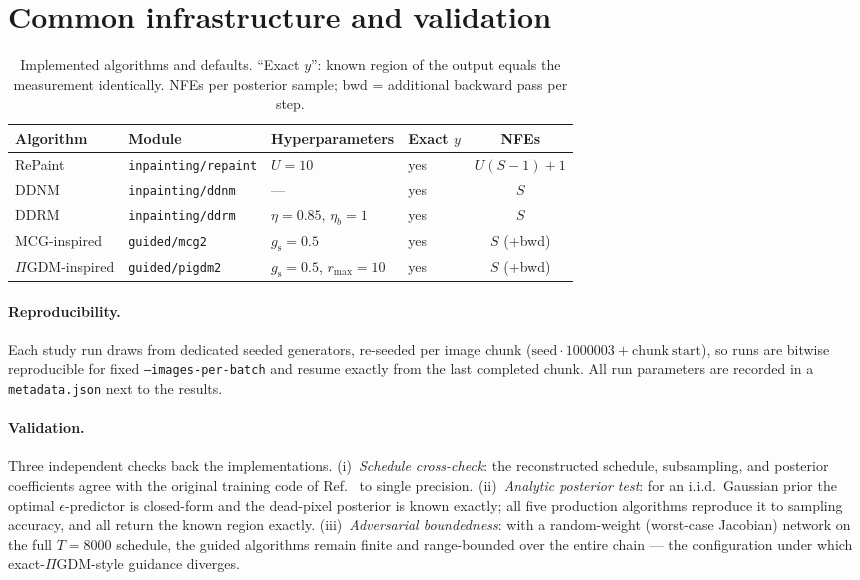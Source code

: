 \documentclass[11pt]{article}
\begin{document}
\section{Common infrastructure and validation}
\label{sec:infra}

\begin{table}[h]
  \centering
  \caption{Implemented algorithms and defaults.  ``Exact $y$'': known
  region of the output equals the measurement identically.  NFEs per
  posterior sample; bwd = additional backward pass per step.}
  \label{tab:summary}
  \begin{tabular}{llllc}
    \toprule
    Algorithm & Module & Hyperparameters & Exact $y$ & NFEs \\
    \midrule
    RePaint & \texttt{inpainting/repaint} & $U{=}10$ & yes & $U(S{-}1){+}1$ \\
    DDNM    & \texttt{inpainting/ddnm}    & --- & yes & $S$ \\
    DDRM    & \texttt{inpainting/ddrm}    & $\eta{=}0.85$, $\eta_b{=}1$ & yes & $S$ \\
    MCG-inspired & \texttt{guided/mcg2}   & $g_{\mathrm{s}}{=}0.5$ & yes & $S$ (+bwd) \\
    $\Pi$GDM-inspired & \texttt{guided/pigdm2} &
        $g_{\mathrm{s}}{=}0.5$, $r_{\max}{=}10$ & yes & $S$ (+bwd) \\
    \bottomrule
  \end{tabular}
\end{table}

\paragraph{Reproducibility.}
Each study run draws from dedicated seeded generators, re-seeded per
image chunk ($\mathrm{seed} \cdot 1000003 + \mathrm{chunk\ start}$), so
runs are bitwise reproducible for fixed \texttt{--images-per-batch} and
resume exactly from the last completed chunk.  All run parameters are
recorded in a \texttt{metadata.json} next to the results.

\paragraph{Validation.}
Three independent checks back the implementations.
(i)~\emph{Schedule cross-check}: the reconstructed schedule, subsampling,
and posterior coefficients agree with the original training code of
Ref.~\cite{torbunov2024calo} to single precision.
(ii)~\emph{Analytic posterior test}: for an i.i.d.\ Gaussian prior the
optimal $\epsilon$-predictor is closed-form and the dead-pixel posterior
is known exactly; all five production algorithms reproduce it to
sampling accuracy, and all return the known region exactly.
(iii)~\emph{Adversarial boundedness}: with a random-weight (worst-case
Jacobian) network on the full $T = 8000$ schedule, the guided algorithms
remain finite and range-bounded over the entire chain --- the
configuration under which exact-$\Pi$GDM-style guidance diverges.



\end{document}
